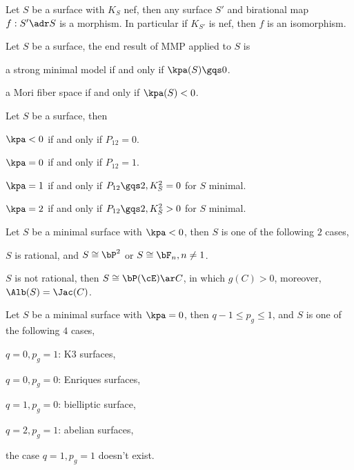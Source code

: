 \documentclass[article, a4paper, twoside]{universal}
\begin{document}
\begin{thm}
	Let $S$ be a surface with $K_{S}$ nef, then any surface $S'$ and birational map $f:S'\adr S$ is a morphism. In particular if $K_{S'}$ is nef, then $f$ is an isomorphism.
\end{thm}

\begin{thm}
	Let $S$ be a surface, the end result of MMP applied to $S$ is
	\begin{enr}
		\item a strong minimal model if and only if $\kpa(S)\gqs0$.
		\item a Mori fiber space if and only if $\kpa(S)<0$.
	\end{enr}
\end{thm}



\begin{thm}[$P_{12}$-theorem]
	Let $S$ be a surface, then
	\begin{enr}
		\item $\kpa<0$ if and only if $P_{12}=0$.
		\item $\kpa=0$ if and only if $P_{12}=1$.
		\item $\kpa=1$ if and only if $P_{12}\gqs2, K_{S}^{2}=0$ for $S$ minimal.
		\item $\kpa=2$ if and only if $P_{12}\gqs2, K_{S}^{2}>0$ for $S$ minimal.
	\end{enr}
\end{thm}

\begin{thm}
	Let $S$ be a minimal surface with $\kpa<0$, then $S$ is one of the following $2$ cases,
	\begin{enr}
		\item $S$ is rational, and $S\cong\bP^{2}$ or $S\cong\bF_{n}, n\neq1$.
		\item $S$ is not rational, then $S\cong\bP(\cE)\ar C$, in which $g(C)>0$, moreover, $\Alb(S)=\Jac(C)$.
	\end{enr}
\end{thm}

\begin{thm}
	Let $S$ be a minimal surface with $\kpa=0$, then $q-1\leq p_{g}\leq1$, and $S$ is one of the following $4$ cases,
	\begin{enr}
		\item $q=0, p_{g}=1$: K3 surfaces,
		\item $q=0, p_{g}=0$: Enriques surfaces,
		\item $q=1, p_{g}=0$: bielliptic surface,
		\item $q=2, p_{g}=1$: abelian surfaces,
	\end{enr}
	the case $q=1,p_{g}=1$ doesn't exist.
\end{thm}
\end{document}
